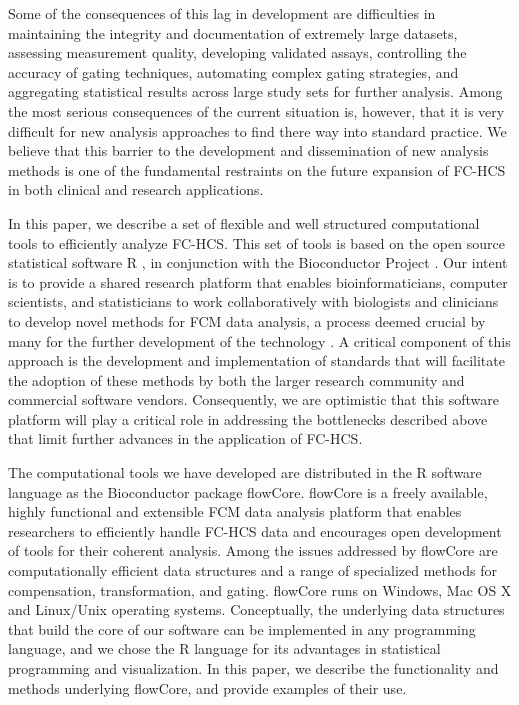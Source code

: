 \documentclass[12pt]{article}
\newcommand{\Rpackage}[1]{{\textsf{#1}}}
\begin{document}
Some of the consequences of this lag in development are difficulties
in maintaining the integrity and documentation of extremely large
datasets, assessing measurement quality, developing validated assays,
controlling the accuracy of gating techniques, automating complex
gating strategies, and aggregating statistical results across large
study sets for further analysis.  Among the most serious consequences
of the current situation is, however, that it is very difficult for
new analysis approaches to find there way into standard practice. We
believe that this barrier to the development and dissemination of new
analysis methods is one of the fundamental restraints on the future
expansion of FC-HCS in both clinical and research applications.

In this paper, we describe a set of flexible and well structured
computational tools to efficiently analyze FC-HCS. This set of tools
is based on the open source statistical software R \citep{Rmain}, in
conjunction with the Bioconductor Project \citep{BIOC}. Our intent is
to provide a shared research platform that enables bioinformaticians,
computer scientists, and statisticians to work collaboratively with
biologists and clinicians to develop novel methods for FCM data
analysis, a process deemed crucial by many for the further development
of the technology \citep{lizard2007fca}. A critical component of this
approach is the development and implementation of standards that will
facilitate the adoption of these methods by both the larger research
community and commercial software vendors.  Consequently, we are
optimistic that this software platform will play a critical role in
addressing the bottlenecks described above that limit further advances
in the application of FC-HCS.

The computational tools we have developed are distributed in the R
software language as the Bioconductor package
\Rpackage{flowCore}. \Rpackage{flowCore} is a freely available, highly
functional and extensible FCM data analysis platform that enables
researchers to efficiently handle FC-HCS data and encourages open
development of tools for their coherent analysis. Among the issues
addressed by \Rpackage{flowCore} are computationally efficient data
structures and a range of specialized methods for compensation,
transformation, and gating.  \Rpackage{flowCore} runs on Windows, Mac
OS X and Linux/Unix operating systems. Conceptually, the underlying
data structures that build the core of our software can be implemented
in any programming language, and we chose the R language for its
advantages in statistical programming and visualization. In this
paper, we describe the functionality and methods underlying
\Rpackage{flowCore}, and provide examples of their use.
\end{document}
